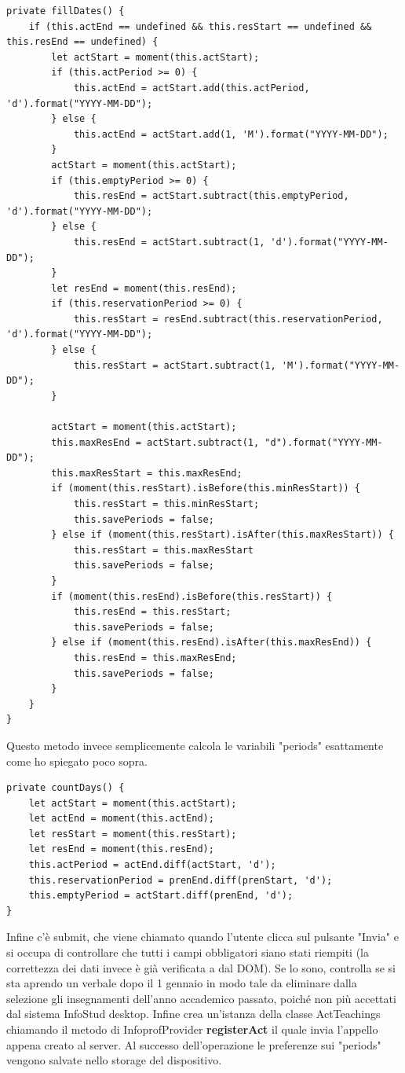 \documentclass[Lau, oneside, noexaminfo]{sapthesis}%
\begin{document}
\begin{lstlisting}[frame=single]
private fillDates() {
	if (this.actEnd == undefined && this.resStart == undefined && this.resEnd == undefined) {
		let actStart = moment(this.actStart);
		if (this.actPeriod >= 0) {
			this.actEnd = actStart.add(this.actPeriod, 'd').format("YYYY-MM-DD");
		} else {
			this.actEnd = actStart.add(1, 'M').format("YYYY-MM-DD");
		}
		actStart = moment(this.actStart);
		if (this.emptyPeriod >= 0) {
			this.resEnd = actStart.subtract(this.emptyPeriod, 'd').format("YYYY-MM-DD");
		} else {
			this.resEnd = actStart.subtract(1, 'd').format("YYYY-MM-DD");
		}
		let resEnd = moment(this.resEnd);
		if (this.reservationPeriod >= 0) {
			this.resStart = resEnd.subtract(this.reservationPeriod, 'd').format("YYYY-MM-DD");
		} else {
			this.resStart = actStart.subtract(1, 'M').format("YYYY-MM-DD");
		}

		actStart = moment(this.actStart);
		this.maxResEnd = actStart.subtract(1, "d").format("YYYY-MM-DD");
		this.maxResStart = this.maxResEnd;
		if (moment(this.resStart).isBefore(this.minResStart)) {
			this.resStart = this.minResStart;
			this.savePeriods = false;
		} else if (moment(this.resStart).isAfter(this.maxResStart)) {
			this.resStart = this.maxResStart
			this.savePeriods = false;
		}
		if (moment(this.resEnd).isBefore(this.resStart)) {
			this.resEnd = this.resStart;
			this.savePeriods = false;
		} else if (moment(this.resEnd).isAfter(this.maxResEnd)) {
			this.resEnd = this.maxResEnd;
			this.savePeriods = false;
		}
	}
}
\end{lstlisting}

Questo metodo invece semplicemente calcola le variabili "periods" esattamente come ho spiegato poco sopra.

\begin{lstlisting}[frame=single]
private countDays() {
	let actStart = moment(this.actStart);
	let actEnd = moment(this.actEnd);
	let resStart = moment(this.resStart);
	let resEnd = moment(this.resEnd);
	this.actPeriod = actEnd.diff(actStart, 'd');
	this.reservationPeriod = prenEnd.diff(prenStart, 'd');
	this.emptyPeriod = actStart.diff(prenEnd, 'd');
}
\end{lstlisting}

Infine c'è submit, che viene chiamato quando l'utente clicca sul pulsante "Invia" e si occupa di controllare che tutti i campi obbligatori siano stati riempiti (la correttezza dei dati invece è già verificata a dal DOM). Se lo sono, controlla se si sta aprendo un verbale dopo il 1 gennaio in modo tale da eliminare dalla selezione gli insegnamenti dell'anno accademico passato, poiché non più accettati dal sistema InfoStud desktop. Infine crea un'istanza della classe ActTeachings chiamando il metodo di InfoprofProvider \textbf{registerAct} il quale invia l'appello appena creato al server. Al successo dell'operazione le preferenze sui "periods" vengono salvate nello storage del dispositivo.
\end{document}
